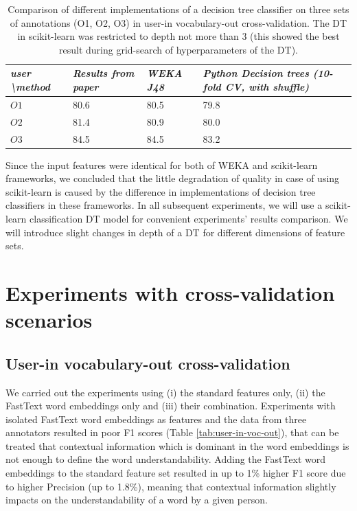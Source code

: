 \begin{table}[h]
\begin{tabular}{L|LLL}
\hline
\textit{user \textbackslash method} & \textit{Results from paper \citep{Grabar-PITR2014}} & \textit{WEKA J48} & \textit{Python Decision trees (10-fold CV, with shuffle)} \\ \hline
$O1$ & 80.6 & 80.5 & 79.8 \\
$O2$ & 81.4 & 80.9 & 80.0 \\
$O3$ & 84.5 & 84.5 & 83.2 \\ \hline
\end{tabular}
    \caption{Comparison of different implementations of a decision tree classifier on three sets of annotations (O1, O2, O3) in user-in vocabulary-out cross-validation. The DT in scikit-learn was restricted to depth not more than 3 (this showed the best result during grid-search of hyperparameters of the DT).}
    \label{tab:results-reproduction}
\end{table}

Since the input features were identical for both of WEKA and scikit-learn frameworks, we concluded that the little degradation of quality in case of using scikit-learn is caused by the difference in implementations of decision tree classifiers in these frameworks. In all subsequent experiments, we will use a scikit-learn classification DT model for convenient experiments' results comparison. We will introduce slight changes in depth of a DT for different dimensions of feature sets.


\section{Experiments with cross-validation scenarios}
\label{sec:cv-experiments}
\subsection{User-in vocabulary-out cross-validation}


We carried out the experiments using (i) the standard features only, (ii) the FastText word embeddings only and (iii) their combination. Experiments with isolated FastText word embeddings as features and the data from three annotators resulted in poor F1 scores (Table \ref{tab:user-in-voc-out}), that can be treated that contextual information which is dominant in the word embeddings is not enough to define the word understandability. Adding the FastText word embeddings to the standard feature set resulted in up to 1\% higher F1 score due to higher Precision (up to 1.8\%), meaning that contextual information slightly impacts on the understandability of a word by a given person.

